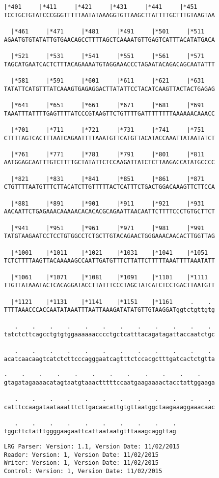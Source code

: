\documentclass{article}
\begin{document}
\begin{Verbatim}[fontfamily=courier]
  |*401     |*411     |*421     |*431     |*441     |*451   
TCCTGCTGTATCCCGGGTTTTTAATATAAAGGTGTTAAGCTTATTTTGCTTTGTAAGTAA

  |*461     |*471     |*481     |*491     |*501     |*511   
AGAATGTGTATATTGTGAACAGCCTTTTAGCTCAAAATGTTGAGTCATTTACATATGACA

  |*521     |*531     |*541     |*551     |*561     |*571   
TAGCATGAATCACTCTTTACAGAAAATGTAGGAAACCCTAGAATACAGACAGCAATATTT

  |*581     |*591     |*601     |*611     |*621     |*631   
TATATTCATGTTTATCAAAGTGAGAGGACTTATATTCCTACATCAAGTTACTACTGAGAG

  |*641     |*651     |*661     |*671     |*681     |*691   
TAAATTTATTTTGAGTTTTATCCCGTAAGTTCTGTTTTGATTTTTTTTAAAAAACAAACC

  |*701     |*711     |*721     |*731     |*741     |*751   
CTTTTAGTCACTTTAATCAGAATTTTAAATGTTCATGTTACATACCAAATTATAATATCT

  |*761     |*771     |*781     |*791     |*801     |*811   
AATGGAGCAATTTGTCTTTTGCTATATTCTCCAAGATTATCTCTTAAGACCATATGCCCC

  |*821     |*831     |*841     |*851     |*861     |*871   
CTGTTTTAATGTTTCTTACATCTTGTTTTTACTCATTTCTGACTGGACAAAGTTCTTCCA

  |*881     |*891     |*901     |*911     |*921     |*931   
AACAATTCTGAGAAACAAAAACACACACGCAGAATTAACAATTCTTTTCCCTGTGCTTCT

  |*941     |*951     |*961     |*971     |*981     |*991   
TATGTAAGAATCCTCCTGTGGCCTCTGCTTGTACAGAACTGGGAAACAACACTTGGTTAG

  |*1001    |*1011    |*1021    |*1031    |*1041    |*1051  
TCTCTTTTAAGTTACAAAAAGCCAATTGATGTTTCTTATTCTTTTTAAATTTTAAATATT

  |*1061    |*1071    |*1081    |*1091    |*1101    |*1111  
TTGTTATAAATACTCACAGGATACCTTATTTCCCTAGCTATCATCTCCTGACTTAATGTT

  |*1121    |*1131    |*1141    |*1151    |*1161     .    . 
TTTTAAACCCACCAATATAAATTTAATTAAAGATATATGTTGTAAGGATggtctgttgtg

   .    .    .    .    .    .    .    .    .    .    .    . 
tatctcttcagcctgtgtggaaaaaacccctgctcatttacagatagattaccaatctgc

   .    .    .    .    .    .    .    .    .    .    .    . 
acatcaacaagtcatctcttcccagggaatcagtttctccacgctttgatcactctgtta

\end{Verbatim}
\newpage
\begin{Verbatim}[fontfamily=courier]
   .    .    .    .    .    .    .    .    .    .    .    . 
gtagatagaaaacatagtaatgtaaactttttccaatgaagaaaactacctattggaaga

   .    .    .    .    .    .    .    .    .    .    .    . 
catttccaagataataaatttcttgacaacattgtgttaatggctaagaaaggaaacaac

   .    .    .    .    .    .    .    .    .    .
tggcttctatttggggaagaattcattaataatgtttaaagcaggttag
\end{Verbatim}
\newpage
\begin{Verbatim}[fontfamily=courier]
LRG Parser: Version: 1.1, Version Date: 11/02/2015
Reader: Version: 1, Version Date: 11/02/2015
Writer: Version: 1, Version Date: 11/02/2015
Control: Version: 1, Version Date: 11/02/2015
\end{Verbatim}
\end{document}
